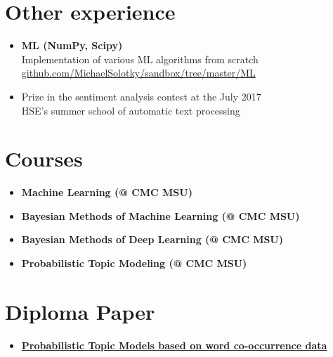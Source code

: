 \documentclass[letterpaper,11pt]{article}
\newcommand{\resumeSubHeadingListStart}{\begin{itemize}[leftmargin=*]}
\newcommand{\resumeSubHeadingListEnd}{\end{itemize}}
\begin{document}
\section{Other experience}
  \resumeSubHeadingListStart
      \item{
        \textbf{ML (NumPy, Scipy)} \\
        Implementation of various ML algorithms from scratch \\
        \faGithub \enspace \href{https://github.com/MichaelSolotky/sandbox/tree/master/ML}{\color{blue} github.com/MichaelSolotky/sandbox/tree/master/ML}
      }
      \vspace{-8pt}
      \item{
        Prize in the sentiment analysis contest at the
        \hfill
        July 2017 \\
        HSE's summer school of automatic text processing

      }
  \resumeSubHeadingListEnd

\vspace{-23pt}
\section{Courses}
  \resumeSubHeadingListStart
      \item{
        \textbf{Machine Learning (@ CMC MSU)} \\
      }
      \vspace{-4pt}
      \item{
        \textbf{Bayesian Methods of Machine Learning (@ CMC MSU)} \\
      }
      \vspace{-4pt}
      \item{
        \textbf{Bayesian Methods of Deep Learning (@ CMC MSU)} \\
      }
      \vspace{-4pt}
      \item{
        \textbf{Probabilistic Topic Modeling (@ CMC MSU)} \\
      }
      \resumeSubHeadingListEnd

\vspace{-23pt}
\section{Diploma Paper}
  \resumeSubHeadingListStart
      \item{
    \textbf{\href{http://www.machinelearning.ru/wiki/images/f/f2/Solotkiy19bsc.pdf}{\color{blue} Probabilistic Topic Models based on word co-occurrence data}}
    }
  \resumeSubHeadingListEnd
\end{document}
